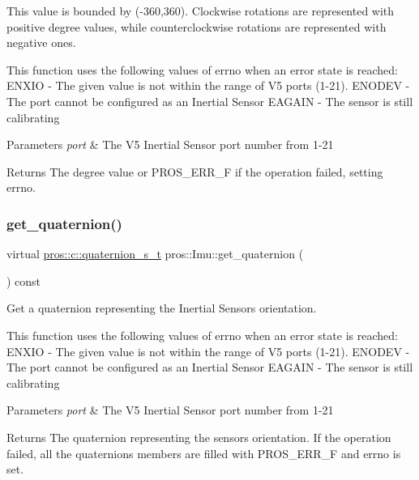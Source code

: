 This value is bounded by (-\/360,360). Clockwise rotations are represented with positive degree values, while counterclockwise rotations are represented with negative ones.

This function uses the following values of errno when an error state is reached\+: E\+N\+X\+IO -\/ The given value is not within the range of V5 ports (1-\/21). E\+N\+O\+D\+EV -\/ The port cannot be configured as an Inertial Sensor E\+A\+G\+A\+IN -\/ The sensor is still calibrating


\begin{DoxyParams}{Parameters}
{\em port} & The V5 Inertial Sensor port number from 1-\/21 \\
\hline
\end{DoxyParams}
\begin{DoxyReturn}{Returns}
The degree value or P\+R\+O\+S\+\_\+\+E\+R\+R\+\_\+F if the operation failed, setting errno. 
\end{DoxyReturn}
\mbox{\label{classpros_1_1Imu_a3656b2476bb3ab8c2539615f76a0db39}} 
\subsubsection{\texorpdfstring{get\+\_\+quaternion()}{get\_quaternion()}}
{\footnotesize\ttfamily virtual \hyperlink{imu_8h_a1f3d4bf4251e6ce7cb374297de6390a1}{pros\+::c\+::quaternion\+\_\+s\+\_\+t} pros\+::\+Imu\+::get\+\_\+quaternion (\begin{DoxyParamCaption}{ }\end{DoxyParamCaption}) const\hspace{0.3cm}{\ttfamily [virtual]}}



Get a quaternion representing the Inertial Sensor\textquotesingle{}s orientation. 

This function uses the following values of errno when an error state is reached\+: E\+N\+X\+IO -\/ The given value is not within the range of V5 ports (1-\/21). E\+N\+O\+D\+EV -\/ The port cannot be configured as an Inertial Sensor E\+A\+G\+A\+IN -\/ The sensor is still calibrating


\begin{DoxyParams}{Parameters}
{\em port} & The V5 Inertial Sensor port number from 1-\/21 \\
\hline
\end{DoxyParams}
\begin{DoxyReturn}{Returns}
The quaternion representing the sensor\textquotesingle{}s orientation. If the operation failed, all the quaternion\textquotesingle{}s members are filled with P\+R\+O\+S\+\_\+\+E\+R\+R\+\_\+F and errno is set. 
\end{DoxyReturn}
\mbox{\label{classpros_1_1Imu_acd2f926bc97121518da774eefe6fc9e2}} 
